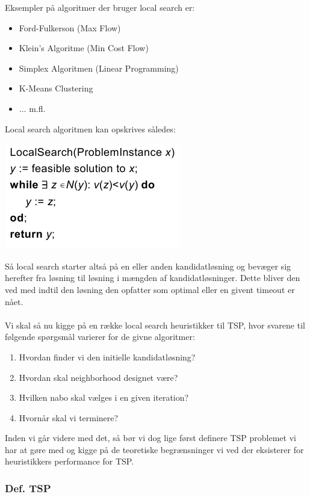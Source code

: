  Eksempler på algoritmer der bruger local search er:
\begin{itemize}
 \item Ford-Fulkerson (Max Flow)
 \item Klein's Algoritme (Min Cost Flow)
 \item Simplex Algoritmen (Linear Programming)
 \item K-Means Clustering
 \item ... m.fl.
\end{itemize}
Local search algoritmen kan opskrives således:
\begin{center}
 \includegraphics[bb=0 0 218 132]{./localSearch.png}
\end{center}
Så local search starter altså på en eller anden kandidatløsning og bevæger sig herefter fra løsning til løsning i mængden af kandidatløsninger. Dette bliver den ved med indtil den løsning den opfatter som optimal eller en givent timeout er nået.\\
~\\
Vi skal så nu kigge på en række local search heuristikker til TSP, hvor svarene til følgende spørgsmål varierer for de givne algoritmer:
\begin{enumerate}
 \item Hvordan finder vi den initielle kandidatløsning?
 \item Hvordan skal neighborhood designet være?
 \item Hvilken nabo skal vælges i en given iteration?
 \item Hvornår skal vi terminere?
\end{enumerate}

Inden vi går videre med det, så bør vi dog lige først definere TSP problemet vi har at gøre med og kigge på de teoretiske begrænsninger vi ved der eksisterer for heuristikkers performance for TSP.

\subsubsection{Def. TSP}

